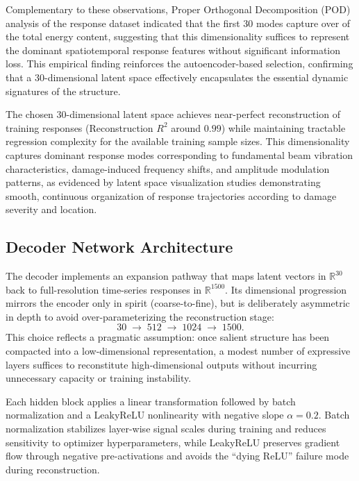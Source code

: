 \documentclass[12pt,a4paper]{report}
\begin{document}
Complementary to these observations, Proper Orthogonal Decomposition (POD) analysis of the response dataset indicated that the first 30 modes capture over  of the total energy content, suggesting that this dimensionality suffices to represent the dominant spatiotemporal response features without significant information loss. This empirical finding reinforces the autoencoder-based selection, confirming that a 30-dimensional latent space effectively encapsulates the essential dynamic signatures of the structure.


The chosen 30-dimensional latent space achieves near-perfect reconstruction of training responses (Reconstruction $R^{2}$ around $0.99$) while maintaining tractable regression complexity for the available training sample sizes. This dimensionality captures dominant response modes corresponding to fundamental beam vibration characteristics, damage-induced frequency shifts, and amplitude modulation patterns, as evidenced by latent space visualization studies demonstrating smooth, continuous organization of response trajectories according to damage severity and location.


\subsection{Decoder Network Architecture}
\label{subsec:decoder_architecture}

The decoder implements an expansion pathway that maps latent vectors in $\mathbb{R}^{30}$ back to full-resolution time-series responses in $\mathbb{R}^{1500}$. Its dimensional progression mirrors the encoder only in spirit (coarse-to-fine), but is deliberately asymmetric in depth to avoid over-parameterizing the reconstruction stage:
\[
30 \;\rightarrow\; 512 \;\rightarrow\; 1024 \;\rightarrow\; 1500.
\]
This choice reflects a pragmatic assumption: once salient structure has been compacted into a low-dimensional representation, a modest number of expressive layers suffices to reconstitute high-dimensional outputs without incurring unnecessary capacity or training instability.

Each hidden block applies a linear transformation followed by batch normalization and a LeakyReLU nonlinearity with negative slope $\alpha=0.2$. Batch normalization stabilizes layer-wise signal scales during training and reduces sensitivity to optimizer hyperparameters, while LeakyReLU preserves gradient flow through negative pre-activations and avoids the ``dying ReLU'' failure mode during reconstruction.
\end{document}
